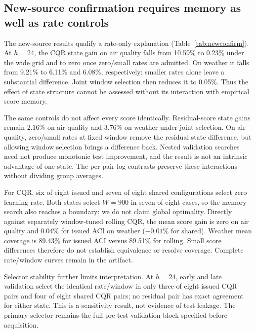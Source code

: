 \subsection{New-source confirmation requires memory as well as rate controls}\label{sec:newresults}
The new-source results qualify a rate-only explanation (Table~\ref{tab:newconfirm}).
At $h=24$, the CQR state gain on air quality falls from 10.59\% to 0.23\% under the
wide grid and to zero once zero/small rates are admitted. On weather it falls from
9.21\% to 6.11\% and 6.08\%, respectively: smaller rates alone leave a substantial
difference. Joint window selection then reduces it to 0.05\%. Thus the effect of
state structure cannot be assessed without its interaction with empirical score memory.

\begin{table}[!htbp]\centering\small
\caption{Locked new-source confirmation, $h=24$. Mean paired issued/shared interval-score
gain (\%), four pairs per source. Each column uses its predefined validation selector.
The final column adds window selection; it does not extend the rate grid again.}
\label{tab:newconfirm}
\end{table}

The same controls do not affect every score identically. Residual-score state gains
remain 2.16\% on air quality and 3.76\% on weather under joint selection. On air quality,
zero/small rates at fixed window remove the residual state difference, but allowing
window selection brings a difference back. Nested validation searches need not produce
monotonic test improvement, and the result is not an intrinsic advantage of one state.
The per-pair log contrasts preserve these interactions without dividing group averages.

For CQR, six of eight issued and seven of eight shared configurations select zero
learning rate. Both states select $W=900$ in seven of eight cases, so the memory search
also reaches a boundary: we do not claim global optimality. Directly against separately
window-tuned rolling CQR, the mean score gain is zero on air quality and 0.04\% for
issued ACI on weather ($-0.01\%$ for shared). Weather mean coverage is 89.43\% for
issued ACI versus 89.51\% for rolling. Small score differences therefore do not establish
equivalence or resolve coverage. Complete rate/window curves remain in the artifact.

Selector stability further limits interpretation. At $h=24$, early and late validation
select the identical rate/window in only three of eight issued CQR pairs and four of
eight shared CQR pairs; no residual pair has exact agreement for either state. This is
a sensitivity result, not evidence of test leakage. The primary selector remains the
full pre-test validation block specified before acquisition.

